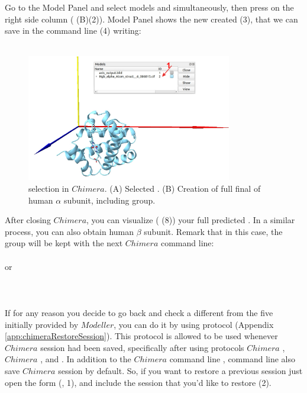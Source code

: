  Go to the Model Panel and select models  and  simultaneously, then press  on the right side column ( (B)(2)). Model Panel shows the new  created  (3), that we can save in the command line (4) writing:\\
 
 \\
 
 \begin{figure}[H]
  \centering 
  \captionsetup{width=.7\linewidth} 
  \includegraphics[width=0.80\textwidth]{Images/Fig16}
  \caption{ selection in $Chimera$. (A) Selected  . (B) Creation of full final  of human  $\alpha$ subunit, including  group.}
  \label{fig:chimera_model}
  \end{figure}
 
 After closing $Chimera$, you can visualize ( (8)) your full predicted . In a similar process, you can also obtain human  $\beta$ subunit. Remark that in this case, the  group will be kept with the next $Chimera$ command line: \\
 \\ or \\
 \\ \\ \\
  
If for any reason you decide to go back and check a different  from the five  initially provided by $Modeller$, you can do it by using  protocol (Appendix \ref{app:chimeraRestoreSession}). This protocol is allowed to be used whenever $Chimera$ session had been saved, specifically after using protocols $Chimera$ , $Chimera$ , and \scipion {}. In addition to the $Chimera$ command line , command line  also save $Chimera$ session by default. So, if you want to restore a previous session just open the form (, 1), and include the session that you'd like to restore (2).

